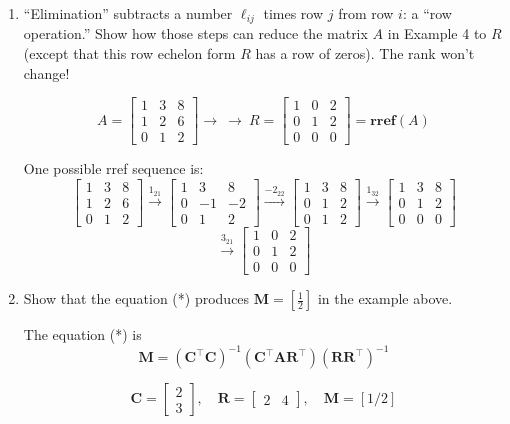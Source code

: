 \documentclass{scrartcl}
\begin{document}
\begin{enumerate}
\item ``Elimination'' subtracts a number $\ell_{ij}$ times row $j$ from row $i$: a ``row operation.'' Show how those steps can reduce the matrix $A$ in Example 4 to $R$ (except that this row echelon form $R$ has a row of zeros). The rank won't change!

$$A = \begin{bmatrix}
	1 & 3 & 8 \\ 1 & 2 & 6 \\ 0 & 1 & 2
\end{bmatrix}\rightarrow \ \rightarrow \ R = \begin{bmatrix}
	1 & 0 & 2 \\ 0 & 1 & 2 \\ 0 & 0 & 0
\end{bmatrix} = \textbf{rref}(A)$$

One possible rref sequence is:
$$\begin{bmatrix}
	1 & 3 & 8 \\ 1 & 2 & 6 \\ 0 & 1 & 2
\end{bmatrix} \stackrel{1_{21}}{\rightarrow} \begin{bmatrix}
	1 & 3 & 8 \\ 0 & -1 & -2 \\ 0 & 1 & 2
\end{bmatrix} \stackrel{-2_{22}}{\rightarrow} \begin{bmatrix}
	1 & 3 & 8 \\ 0 & 1 & 2 \\ 0 & 1 & 2 
\end{bmatrix} \stackrel{1_{32}}{\rightarrow} \begin{bmatrix}
	1 & 3 & 8 \\ 0 & 1 & 2 \\ 0 & 0 & 0
\end{bmatrix}$$
$$\stackrel{3_{21}}{\rightarrow} \begin{bmatrix}
	1 & 0 & 2 \\ 0 & 1 & 2 \\ 0 & 0 & 0
\end{bmatrix}$$

\item Show that the equation (*) produces $\mathbf{M} = [\frac{1}{2}]$ in the example above.

The equation (*) is
$$\mathbf{M} = (\mathbf{C}^\top \mathbf{C})^{-1}(\mathbf{C}^\top \mathbf{A}\mathbf{R}^\top)(\mathbf{R}\mathbf{R}^\top)^{-1}$$

$$\mathbf{C} = \begin{bmatrix}
	2 \\ 3
\end{bmatrix}, \quad \mathbf{R} = \begin{bmatrix}
	2 & 4
\end{bmatrix}, \quad \mathbf{M} = [1/2]$$


\end{enumerate}
\end{document}
